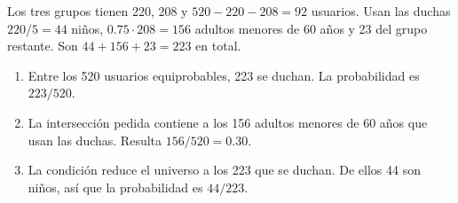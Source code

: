 Los tres grupos tienen 220, 208 y $520-220-208=92$ usuarios.
Usan las duchas $220/5=44$ niños, $0.75\cdot208=156$ adultos menores
de 60 años y 23 del grupo restante. Son $44+156+23=223$ en total.

\begin{enumerate}[label=\alph*)]
\item Entre los 520 usuarios equiprobables, 223 se duchan.
La probabilidad es $\boxed{223/520}$.
\item La intersección pedida contiene a los 156 adultos menores
de 60 años que usan las duchas. Resulta $\boxed{156/520=0.30}$.
\item La condición reduce el universo a los 223 que se duchan.
De ellos 44 son niños, así que la probabilidad es $\boxed{44/223}$.
\end{enumerate}
